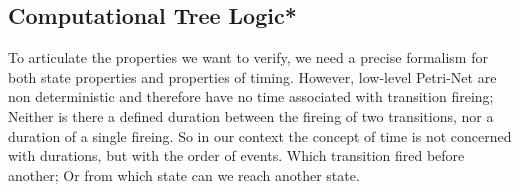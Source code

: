 \subsection{Computational Tree Logic*}
\label{rel_ctl}
To articulate the properties we want to verify, we need a precise formalism for both state properties and properties of timing.
However, low-level Petri-Net are non deterministic and therefore have no time associated with transition fireing;
Neither is there a defined duration between the fireing of two transitions, nor a duration of a single fireing.
So in our context the concept of time is not concerned with durations, but with the order of events.
Which transition fired before another; Or from which state can we reach another state.

